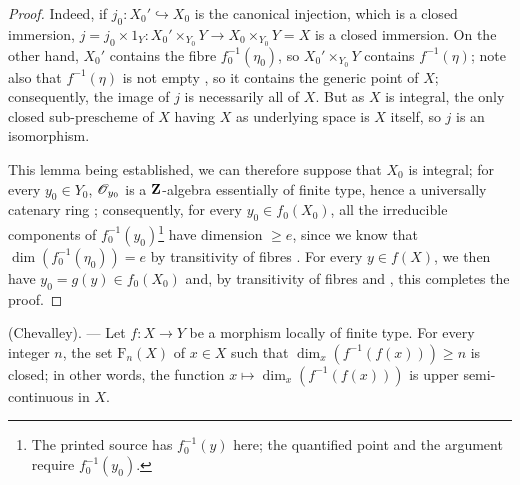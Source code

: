 \begin{proof}
Indeed, if $j_0:X_0'\hookrightarrow X_0$ is the canonical injection, which is a closed immersion, $j=j_0\times 1_Y:X_0'\times_{Y_0}Y\to X_0\times_{Y_0}Y=X$ is a closed immersion.
On the other hand, $X_0'$ contains the fibre $f_0^{-1}(\eta_0)$, so $X_0'\times_{Y_0}Y$ contains $f^{-1}(\eta)$; note also that $f^{-1}(\eta)$ is not empty , so it contains the generic point of $X$; consequently, the image of $j$ is necessarily all of $X$.
But as $X$ is integral, the only closed sub-prescheme of $X$ having $X$ as underlying space is $X$ itself, so $j$ is an isomorphism.

This lemma being established, we can therefore suppose that $X_0$ is integral; for every $y_0\in Y_0$, $\mathscr{O}_{y_0}$ is a $\mathbf{Z}$-algebra essentially of finite type, hence a universally
catenary ring ; consequently, for every $y_0\in f_0(X_0)$, all the irreducible components of $f_0^{-1}(y_0)$\footnote{The printed source has $f_0^{-1}(y)$ here; the quantified point and the argument require $f_0^{-1}(y_0)$.} have dimension $\geq e$, since we know that $\dim(f_0^{-1}(\eta_0))=e$ by transitivity of fibres .
For every $y\in f(X)$, we then have $y_0=g(y)\in f_0(X_0)$ and, by transitivity of fibres and , this completes the proof.
\end{proof}

\begin{theorem}[13.1.3]
\label{IV.13.1.3}
\textnormal{(Chevalley).} ---
Let $f:X\to Y$ be a morphism locally of finite type.
For every integer $n$, the set $\mathrm{F}_n(X)$ of $x\in X$ such that $\dim_x(f^{-1}(f(x)))\geq n$ is closed; in other words, the function $x\mapsto\dim_x(f^{-1}(f(x)))$ is upper semi-continuous in $X$.
\end{theorem}

